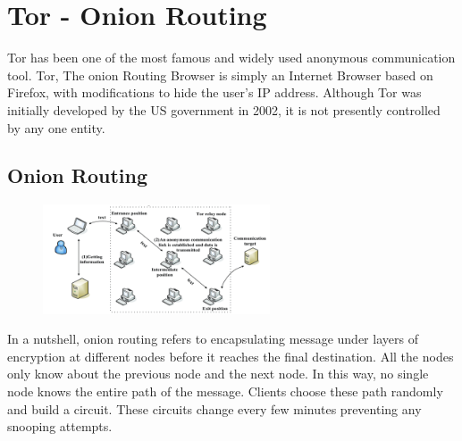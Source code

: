 \documentclass{main}
\begin{document}
\section{Tor - Onion Routing}
Tor has been one of the most famous and widely used anonymous communication tool.
Tor, The onion Routing Browser is simply an Internet Browser based on Firefox, with modifications to hide the user's IP address. 
Although Tor was initially developed by the US government in 2002, it is not presently controlled by any one entity.

\subsection{Onion Routing}

\begin{figure}
    \centering
    \includegraphics[width=0.6\textwidth]{Resources/images/onion-routing.png}
\end{figure}

In a nutshell, onion routing refers to encapsulating message under layers of encryption at different nodes before it reaches the final destination. 
All the nodes only know about the previous node and the next node. 
In this way, no single node knows the entire path of the message. 
Clients choose these path randomly and build a circuit. 
These circuits change every few minutes preventing any snooping attempts. 
\end{document}
